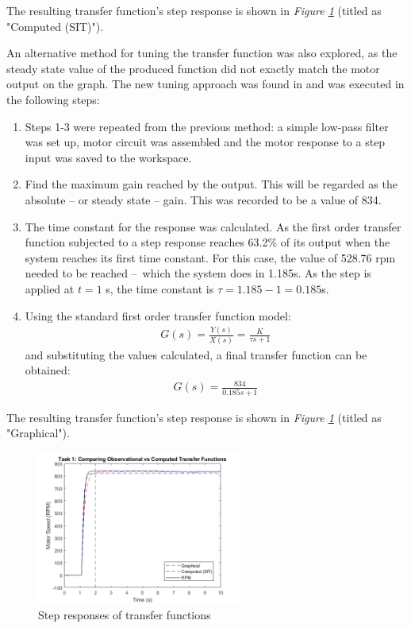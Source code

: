 \documentclass[11pt, onecolumn]{article}
\begin{document}
\par The resulting transfer function's step response is shown in \textit{Figure \ref{fig:q1-graph}} (titled as "Computed (SIT)"). \\\:
\par An alternative method for tuning the transfer function was also explored, as the steady state value of the produced function did not exactly match the motor output on the graph. The new tuning approach was found in \cite{umichControlTutorials} and was executed in the following steps:
\begin{enumerate}
    \item Steps 1-3 were repeated from the previous method: a simple low-pass filter was set up, motor circuit was assembled and the motor response to a step input was saved to the workspace.
    \item Find the maximum gain reached by the output. This will be regarded as the absolute – or steady state – gain. This was recorded to be a value of 834.
    \item The time constant for the response was calculated. As the first order transfer function subjected to a step response reaches 63.2\% of its output when the system reaches its first time constant. For this case, the value of 528.76 rpm needed to be reached – which the system does in 1.185s. As the step is applied at $t=1$ s, the time constant is $\tau = 1.185 - 1 = 0.185$s.
    \item Using the standard first order transfer function model:
          \begin{align*}
              G(s)=\frac{Y(s)}{X(s)}=\frac{K}{\tau s + 1}
          \end{align*}
          and substituting the values calculated, a final transfer function can be obtained:
          \begin{align*}
              G(s)=\frac{834}{0.185s + 1}
          \end{align*}
\end{enumerate}
\par The resulting transfer function's step response is shown in \textit{Figure \ref{fig:q1-graph}} (titled as "Graphical").
\begin{figure}[h!]
    \centering
    \includegraphics[width=0.6\textwidth]{q1-graphs.png}
    \caption{Step responses of transfer functions }
    \label{fig:q1-graph}
\end{figure}
\end{document}
